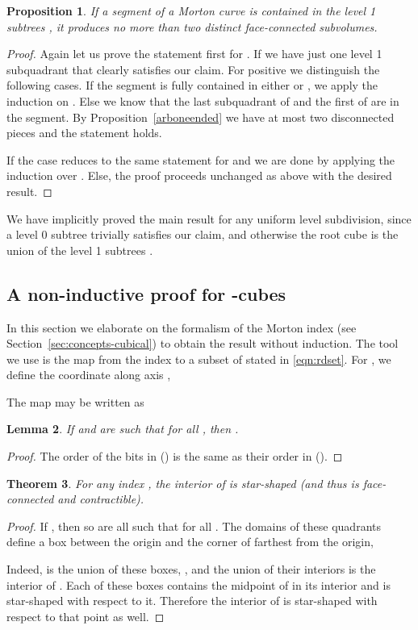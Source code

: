 \documentclass[a4paper,11pt]{article}
\newcommand{\eqnref}[1]{\eqref{eqn:#1}}
\newcommand{\seclab}[1]{\label{sec:#1}}
\newcommand{\secref}[1]{Section~\ref{sec:#1}}
\newcommand{\thmlab}[1]{\label{thm:#1}}
\newtheorem{thm}{Theorem}
\newtheorem{prop}[thm]{Proposition}
\newtheorem{lem}[thm]{Lemma}
\begin{document}
\begin{prop}
  \label{arbtwoended}
  If a segment of a Morton curve is contained in the level 1 subtrees ,
  it produces no more than two distinct face-connected subvolumes.
\end{prop}
\begin{proof}
  Again let us prove the statement first for .  If  we have just
  one level 1 subquadrant that clearly satisfies our claim.  For positive
   we distinguish the following cases.  If the segment is fully contained
  in either  or , we apply the induction on .  Else we know
  that the last subquadrant of  and the first of  are in the
  segment.  By Proposition~\ref{arboneended} we have at most two disconnected
  pieces and the statement holds.
  
  If  the case  reduces to the same statement for  and we
  are done by applying the induction over .  Else, the proof proceeds
  unchanged as above with the desired result.
\end{proof}
We have implicitly proved the main result for any uniform level 
subdivision, since a level 0 subtree trivially satisfies our claim, and
otherwise the root cube is the union of the level 1 subtrees .

\subsection{A non-inductive proof for -cubes}
\seclab{nonrecursiveproofs}



In this section we elaborate on the formalism of the Morton index
(see \secref{concepts-cubical}) to obtain the result without induction.
The tool we use is the map  from the index
 to a subset of  stated in \eqnref{rdset}.
For , we define the coordinate along axis ,

The map  may be written as


\begin{lem}
 If  and  are such that  for all , then .
\end{lem}
\begin{proof}
  The order of the bits in  () is the same as their order in
   ().
\end{proof}

\begin{thm}
  \thmlab{Y0}
  For any index , the interior of  is star-shaped (and thus  is face-connected and contractible).
\end{thm}
\begin{proof}
  If , then so are all  such that
   for all .  The domains of these
  quadrants define a box between the origin and the corner of 
  farthest from the origin,

Indeed,  is the union of these boxes, , and the union of their interiors is the interior of .  Each of
  these boxes contains the midpoint of  in its interior and is
  star-shaped with respect to it.  Therefore the interior of  is
  star-shaped with respect to that point as well.
\end{proof}
\end{document}

